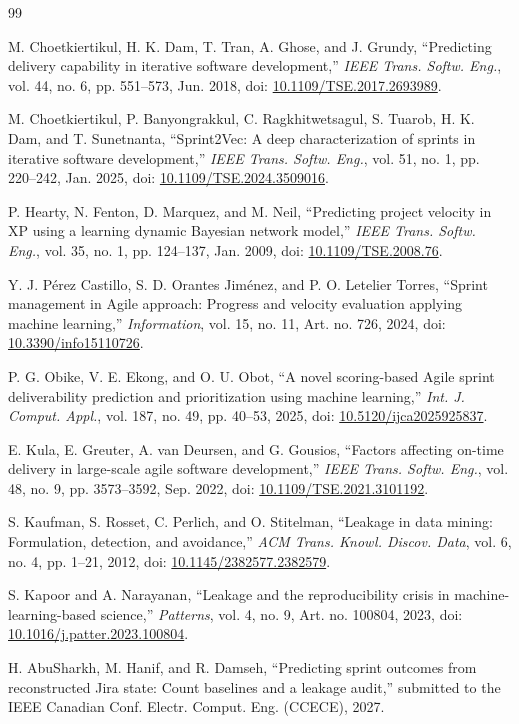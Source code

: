 \documentclass[journal]{IEEEtran}
\begin{document}
\begin{thebibliography}{99}

 M. Choetkiertikul, H. K. Dam, T. Tran, A. Ghose, and J. Grundy, ``Predicting delivery capability in iterative software development,'' \emph{IEEE Trans. Softw. Eng.}, vol. 44, no. 6, pp. 551--573, Jun. 2018, doi: \url{10.1109/TSE.2017.2693989}.

 M. Choetkiertikul, P. Banyongrakkul, C. Ragkhitwetsagul, S. Tuarob, H. K. Dam, and T. Sunetnanta, ``Sprint2Vec: A deep characterization of sprints in iterative software development,'' \emph{IEEE Trans. Softw. Eng.}, vol. 51, no. 1, pp. 220--242, Jan. 2025, doi: \url{10.1109/TSE.2024.3509016}.

 P. Hearty, N. Fenton, D. Marquez, and M. Neil, ``Predicting project velocity in XP using a learning dynamic Bayesian network model,'' \emph{IEEE Trans. Softw. Eng.}, vol. 35, no. 1, pp. 124--137, Jan. 2009, doi: \url{10.1109/TSE.2008.76}.

 Y. J. P\'erez Castillo, S. D. Orantes Jim\'enez, and P. O. Letelier Torres, ``Sprint management in Agile approach: Progress and velocity evaluation applying machine learning,'' \emph{Information}, vol. 15, no. 11, Art. no. 726, 2024, doi: \url{10.3390/info15110726}.

 P. G. Obike, V. E. Ekong, and O. U. Obot, ``A novel scoring-based Agile sprint deliverability prediction and prioritization using machine learning,'' \emph{Int. J. Comput. Appl.}, vol. 187, no. 49, pp. 40--53, 2025, doi: \url{10.5120/ijca2025925837}.

 E. Kula, E. Greuter, A. van Deursen, and G. Gousios, ``Factors affecting on-time delivery in large-scale agile software development,'' \emph{IEEE Trans. Softw. Eng.}, vol. 48, no. 9, pp. 3573--3592, Sep. 2022, doi: \url{10.1109/TSE.2021.3101192}.

 S. Kaufman, S. Rosset, C. Perlich, and O. Stitelman, ``Leakage in data mining: Formulation, detection, and avoidance,'' \emph{ACM Trans. Knowl. Discov. Data}, vol. 6, no. 4, pp. 1--21, 2012, doi: \url{10.1145/2382577.2382579}.

 S. Kapoor and A. Narayanan, ``Leakage and the reproducibility crisis in machine-learning-based science,'' \emph{Patterns}, vol. 4, no. 9, Art. no. 100804, 2023, doi: \url{10.1016/j.patter.2023.100804}.

 H. AbuSharkh, M. Hanif, and R. Damseh, ``Predicting sprint outcomes from reconstructed Jira state: Count baselines and a leakage audit,'' submitted to the IEEE Canadian Conf. Electr. Comput. Eng. (CCECE), 2027.


\end{thebibliography}
\end{document}

